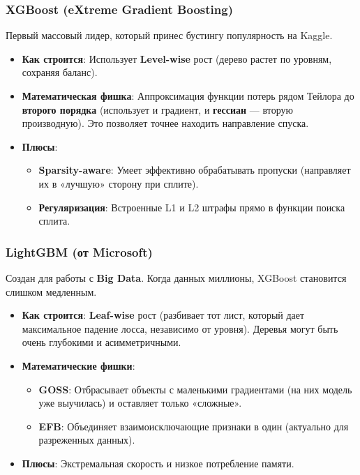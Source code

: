 \documentclass[12pt]{article}
\begin{document}
\subsubsection{XGBoost (eXtreme Gradient Boosting)}
Первый массовый лидер, который принес бустингу популярность на Kaggle.
\begin{itemize}
    \item \textbf{Как строится}: Использует \textbf{Level-wise} рост (дерево растет по уровням, сохраняя баланс).
    \item \textbf{Математическая фишка}: Аппроксимация функции потерь рядом Тейлора до \textbf{второго порядка} (использует и градиент, и \textbf{гессиан} — вторую производную). Это позволяет точнее находить направление спуска.
    \item \textbf{Плюсы}:
    \begin{itemize}
        \item \textbf{Sparsity-aware}: Умеет эффективно обрабатывать пропуски (направляет их в «лучшую» сторону при сплите).
        \item \textbf{Регуляризация}: Встроенные L1 и L2 штрафы прямо в функции поиска сплита.
    \end{itemize}
\end{itemize}

\subsubsection{LightGBM (от Microsoft)}
Создан для работы с \textbf{Big Data}. Когда данных миллионы, XGBoost становится слишком медленным.
\begin{itemize}
    \item \textbf{Как строится}: \textbf{Leaf-wise} рост (разбивает тот лист, который дает максимальное падение лосса, независимо от уровня). Деревья могут быть очень глубокими и асимметричными.
    \item \textbf{Математические фишки}: 
    \begin{itemize}
        \item \textbf{GOSS}: Отбрасывает объекты с маленькими градиентами (на них модель уже выучилась) и оставляет только «сложные».
        \item \textbf{EFB}: Объединяет взаимоисключающие признаки в один (актуально для разреженных данных).
    \end{itemize}
    \item \textbf{Плюсы}: Экстремальная скорость и низкое потребление памяти.
\end{itemize}
\end{document}
